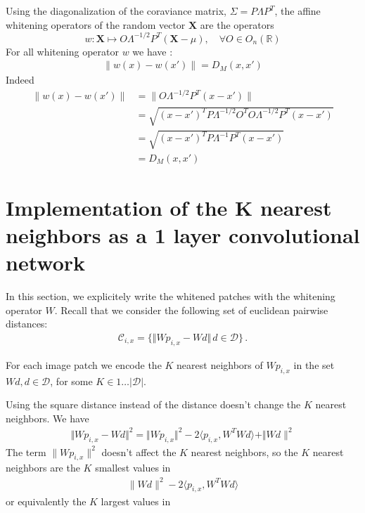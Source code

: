 \documentclass{article}
\begin{document}
Using the diagonalization of the coraviance matrix,  $\Sigma = P\Lambda P^T$, the affine whitening operators of the random vector $\mathbf{X}$ are the operators 
\begin{equation}
\label{whitening}
     w : \mathbf{X} \mapsto O \Lambda^{-1/2} P^T (\mathbf{X} - \mu), \quad \forall O \in  O_n (\mathbb{R})
\end{equation}
For all whitening operator $w$ we have :
\begin{align*}
\|w(x) - w(x')\| = D_M(x, x')
\end{align*}
Indeed 
\begin{align*}
  \|w(x) - w(x')\|
    &= \| O \Lambda^{-1/2} P^T ( x - x') \|\\
    &= \sqrt{(x - x')^T P \Lambda^{-1/2} O^T O \Lambda^{-1/2} P^T (x - x') }\\
    &=  \sqrt{ (x - x')^T P \Lambda^{-1} P^T (x - x')} \\
    &= D_M(x, x') 
\end{align*}

\section{Implementation of the K nearest neighbors as a 1 layer convolutional network}

In this section, we explicitely write the whitened patches with the whitening operator $W$.
Recall that  we consider the following set of euclidean pairwise distances:
\begin{align*}\mathcal{C}_{i, x} =\{\Vert W p_{i, x} - W d \Vert\, d\in\mathcal{D} \}\,.\end{align*}

For each image patch we encode the $K$ nearest neighbors of $W p_{i,x}$ in the set $Wd, d \in \mathcal{D}$, for some $ K \in 1 \ldots|\mathcal{D}| $.

Using the square distance instead of the distance doesn't change the $K$ nearest neighbors.
We have 
\begin{align*} \Vert Wp_{i,x} - Wd \Vert^2 = \Vert Wp_{i,x} \Vert^2 - 2 \langle p_{i,x}, W^T W d \rangle + \Vert Wd\|^2 \end{align*}
The term $\|Wp_{i,x}\|^2$ doesn't affect the $K$ nearest neighbors, so the $K$ nearest neighbors are the $K$ smallest values in
\begin{align*}
        \|Wd \|^2 - 2\langle p_{i,x}, W^T W d \rangle
\end{align*}
or equivalently the  $K$ largest values in
\end{document}
